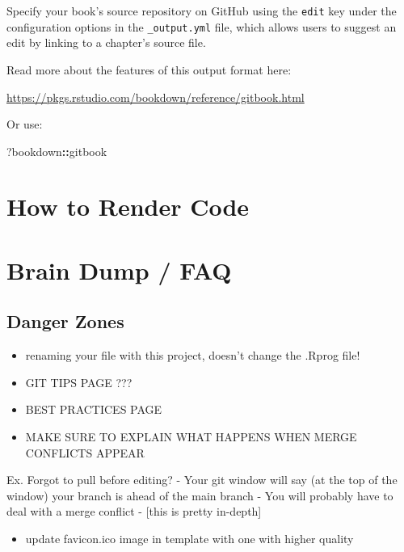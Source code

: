 \documentclass[
]{book}
\newenvironment{Shaded}{\begin{snugshade}}{\end{snugshade}}
\newcommand{\NormalTok}[1]{#1}
\newcommand{\SpecialCharTok}[1]{\textcolor[rgb]{0.81,0.36,0.00}{\textbf{#1}}}
\providecommand{\tightlist}{%
  \setlength{\itemsep}{0pt}\setlength{\parskip}{0pt}}
\theoremstyle{definition}
\theoremstyle{definition}
\theoremstyle{definition}
\theoremstyle{definition}
\theoremstyle{remark}
\begin{document}
Specify your book's source repository on GitHub using the \texttt{edit} key under the configuration options in the \texttt{\_output.yml} file, which allows users to suggest an edit by linking to a chapter's source file.

Read more about the features of this output format here:

\url{https://pkgs.rstudio.com/bookdown/reference/gitbook.html}

Or use:

\begin{Shaded}
\begin{Highlighting}[]
\NormalTok{?bookdown}\SpecialCharTok{::}\NormalTok{gitbook}
\end{Highlighting}
\end{Shaded}

\chapter{How to Render Code}\label{how-to-render-code}

\chapter{Brain Dump / FAQ}\label{brain-dump-faq}

\section{Danger Zones}\label{danger-zones}

\begin{itemize}
\item
  renaming your file with this project, doesn't change the .Rprog file!
\item
  GIT TIPS PAGE ???
\item
  BEST PRACTICES PAGE
\item
  MAKE SURE TO EXPLAIN WHAT HAPPENS WHEN MERGE CONFLICTS APPEAR
\end{itemize}

Ex. Forgot to pull before editing?
- Your git window will say (at the top of the window) your branch is ahead of the main branch
- You will probably have to deal with a merge conflict
- {[}this is pretty in-depth{]}

\begin{itemize}
\tightlist
\item
  update favicon.ico image in template with one with higher quality
\end{itemize}
\end{document}
